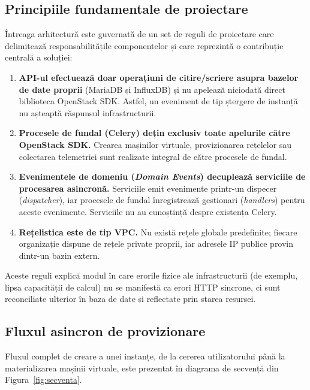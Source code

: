 \subsection{Principiile fundamentale de proiectare}
\label{subsec:cap3_principii}

Întreaga arhitectură este guvernată de un set de reguli de proiectare care delimitează responsabilitățile componentelor și care reprezintă o contribuție centrală a soluției:

\begin{enumerate}
    \item \textbf{API-ul efectuează doar operațiuni de citire/scriere asupra bazelor de date proprii} (MariaDB și InfluxDB) și nu apelează niciodată direct biblioteca OpenStack SDK. Astfel, un eveniment de tip ștergere de instanță nu așteaptă răspunsul infrastructurii.
    \item \textbf{Procesele de fundal (Celery) dețin exclusiv toate apelurile către OpenStack SDK.} Crearea mașinilor virtuale, provizionarea rețelelor sau colectarea telemetriei sunt realizate integral de către procesele de fundal.
    \item \textbf{Evenimentele de domeniu (\textit{Domain Events}) decuplează serviciile de procesarea asincronă.} Serviciile emit evenimente printr-un dispecer (\textit{dispatcher}), iar procesele de fundal înregistrează gestionari (\textit{handlers}) pentru aceste evenimente. Serviciile nu au cunoștință despre existența Celery.
    \item \textbf{Rețelistica este de tip VPC.} Nu există rețele globale predefinite; fiecare organizație dispune de rețele private proprii, iar adresele IP publice provin dintr-un bazin extern.
\end{enumerate}

Aceste reguli explică modul în care erorile fizice ale infrastructurii (de exemplu, lipsa capacității de calcul) nu se manifestă ca erori HTTP sincrone, ci sunt reconciliate ulterior în baza de date și reflectate prin starea resursei.

\subsection{Fluxul asincron de provizionare}
\label{subsec:cap3_flux}

Fluxul complet de creare a unei instanțe, de la cererea utilizatorului până la materializarea mașinii virtuale, este prezentat în diagrama de secvență din Figura~\ref{fig:secventa}.

